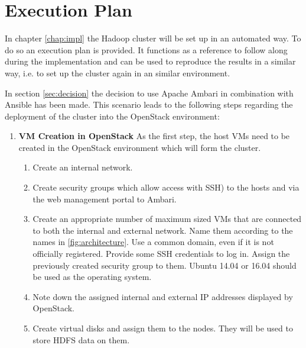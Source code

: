 \section{Execution Plan}

In chapter \ref{chap:impl} the Hadoop cluster will be set up in an automated way.
To do so an execution plan is provided.
It functions as a reference to follow along during the implementation 
and can be used to reproduce the results in a similar way, i.e. to set up the cluster again in an similar environment.

In section \vref{sec:decision} the decision to use Apache Ambari in combination with Ansible has been made.
This scenario leads to the following steps regarding the deployment of the cluster into the OpenStack environment:

\begin{enumerate}
    \item \textbf{\ac{VM} Creation in OpenStack}
    As the first step, the host \acp{VM} need to be created in the OpenStack environment which will form the cluster.
    \begin{enumerate}
        \item Create an internal network.
        \item Create security groups which allow access with \ac{SSH}) to the hosts and via the web management portal to Ambari.
        \item Create an appropriate number of maximum sized \acp{VM} that are connected to both the internal and external network. Name them according to the names in \ref{fig:architecture}. Use a common domain, even if it is not officially registered. Provide some SSH credentials to log in.
        Assign the previously created security group to them.
        Ubuntu 14.04 or 16.04 should be used as the operating system.
        \item Note down the assigned internal and external \ac{IP} addresses displayed by OpenStack.
        \item Create virtual disks and assign them to the nodes. They will be used to store \ac{HDFS} data on them.
    \end{enumerate}
    

\end{enumerate}
